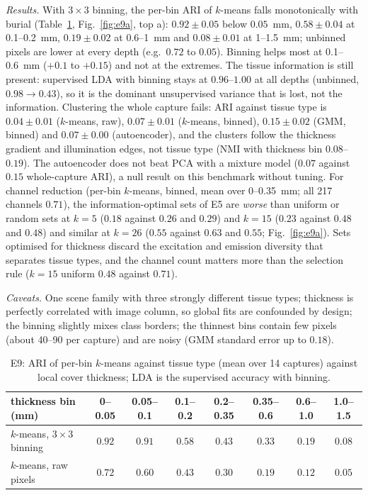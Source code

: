 \documentclass[journal]{IEEEtran}
\begin{document}
\emph{Results.} With $3\times3$ binning, the per-bin ARI of $k$-means falls monotonically with burial (Table~\ref{tab:e9}, Fig.~\ref{fig:e9a}, top a): $0.92\pm0.05$ below $0.05$~mm, $0.58\pm0.04$ at 0.1--0.2~mm, $0.19\pm0.02$ at 0.6--1~mm and $0.08\pm0.01$ at 1--1.5~mm; unbinned pixels are lower at every depth (e.g.\ $0.72$ to $0.05$). Binning helps most at 0.1--0.6~mm ($+0.1$ to $+0.15$) and not at the extremes. The tissue information is still present: supervised LDA with binning stays at $0.96$--$1.00$ at all depths (unbinned, $0.98\to0.43$), so it is the dominant unsupervised variance that is lost, not the information. Clustering the whole capture fails: ARI against tissue type is $0.04\pm0.01$ ($k$-means, raw), $0.07\pm0.01$ ($k$-means, binned), $0.15\pm0.02$ (GMM, binned) and $0.07\pm0.00$ (autoencoder), and the clusters follow the thickness gradient and illumination edges, not tissue type (NMI with thickness bin $0.08$--$0.19$). The autoencoder does not beat PCA with a mixture model ($0.07$ against $0.15$ whole-capture ARI), a null result on this benchmark without tuning. For channel reduction (per-bin $k$-means, binned, mean over 0--0.35~mm; all 217 channels $0.71$), the information-optimal sets of E5 are \emph{worse} than uniform or random sets at $k=5$ ($0.18$ against $0.26$ and $0.29$) and $k=15$ ($0.23$ against $0.48$ and $0.48$) and similar at $k=26$ ($0.55$ against $0.63$ and $0.55$; Fig.~\ref{fig:e9a}). Sets optimised for thickness discard the excitation and emission diversity that separates tissue types, and the channel count matters more than the selection rule ($k=15$ uniform $0.48$ against $0.71$).

\emph{Caveats.} One scene family with three strongly different tissue types; thickness is perfectly correlated with image column, so global fits are confounded by design; the binning slightly mixes class borders; the thinnest bins contain few pixels (about 40--90 per capture) and are noisy (GMM standard error up to $0.18$).

\begin{table}[!t]
\caption{E9: ARI of per-bin $k$-means against tissue type (mean over 14 captures) against local cover thickness; LDA is the supervised accuracy with binning.}
\label{tab:e9}
\centering\small
\begin{tabular}{@{}lccccccc@{}}
\toprule
thickness bin (mm) & 0--0.05 & 0.05--0.1 & 0.1--0.2 & 0.2--0.35 & 0.35--0.6 & 0.6--1.0 & 1.0--1.5\\
\midrule
$k$-means, $3\times3$ binning & $0.92$ & $0.91$ & $0.58$ & $0.43$ & $0.33$ & $0.19$ & $0.08$\\
$k$-means, raw pixels & $0.72$ & $0.60$ & $0.43$ & $0.30$ & $0.19$ & $0.12$ & $0.05$\\
\bottomrule
\end{tabular}
\end{table}
\end{document}

